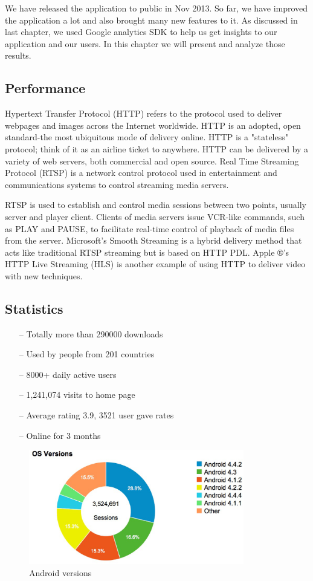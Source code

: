 
We have released the application to public in Nov 2013. So far, we have improved
the application a lot and also brought many new features to it. As discussed in
last chapter, we used Google analytics SDK to help us get insights to our
application and our users. In this chapter we will present and analyze those
results.
\subsection{Performance}
Hypertext Transfer Protocol (HTTP) refers to the protocol used to deliver
webpages and images across the Internet worldwide. HTTP is an adopted, open
standard-the most ubiquitous mode of delivery online. HTTP is a "stateless"
protocol; think of it as an airline ticket to anywhere. HTTP can be delivered
by a variety of web servers, both commercial and open source.
Real Time Streaming Protocol (RTSP) is a network control protocol used in
entertainment and communications systems to control streaming media servers.


RTSP is used to establish and control media sessions between two points,
usually server and player client. Clients of media servers issue VCR-like
commands, such as PLAY and PAUSE, to facilitate real-time control of playback
of media files from the server. Microsoft's Smooth Streaming is a hybrid
delivery method that acts like traditional RTSP streaming but is based on HTTP
PDL. Apple ®'s HTTP Live Streaming (HLS) is another example of using HTTP to
deliver video with new techniques.

\subsection{Statistics}
\begin{itemize}
\item[--]Totally more than 290000 downloads
\item[--]Used by people from 201 countries
\item[--]8000+ daily active users
\item[--]1,241,074 visits to home page
\item[--]Average rating 3.9, 3521 user gave rates
\item[--]Online for 3 months
\end{itemize}
\begin{figure}[htb]
\centering \includegraphics[height=5cm]{charts/android_versions}
\caption{Android versions \label{chart6}}
\end{figure}

